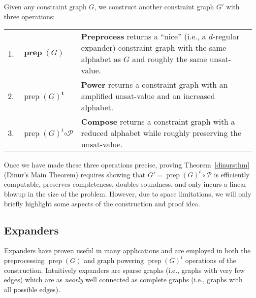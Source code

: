 \documentclass{article}
\newcommand{\N}{{\mathbf N}}
\newcommand{\UNSAT}{\mathsf{UNSAT}}
\newcommand{\prep}{{\operatorname{prep}}}
\begin{document}
Given any constraint graph $G$,
we construct another constraint graph $G'$
with three operations:
\begin{center}
\begin{tabular}{l l p{10cm}}
1. & $\boldsymbol{\prep}(G)$ & \textbf{Preprocess} returns a ``nice'' (i.e., a $d$-regular expander)
       constraint graph with the same alphabet as $G$ and roughly the same unsat-value.\\
2. & $\prep(G)^{\boldsymbol{t}}$ & \textbf{Power} returns a constraint graph with an amplified
                    unsat-value and an increased alphabet. \\
3. & $\prep(G)^t \boldsymbol{\circ \mathcal{P}}$ & \textbf{Compose} returns a constraint graph with a reduced alphabet while roughly
                   preserving the unsat-value.
\end{tabular}
\end{center}
Once we have made these three operations precise,
proving Theorem~\ref{dinursthm} (Dinur's Main Theorem)
requires showing that $G' = \prep(G)^t \circ \mathcal{P}$ is efficiently
computable, preserves completeness, doubles soundness, and only
incurs a linear blowup in the size of the problem.
However, due to space limitations, we will only briefly highlight some
aspects of the construction and proof idea.

\subsection{Expanders}

Expanders have proven useful in many applications
and are employed in both the preprocessing $\prep(G)$ and graph powering $\prep(G)^t$ operations
of the construction.
Intuitively expanders are sparse graphs (i.e., graphs with very few edges)
which are as \emph{nearly} well connected as complete graphs (i.e., graphs with all possible edges).
\end{document}

